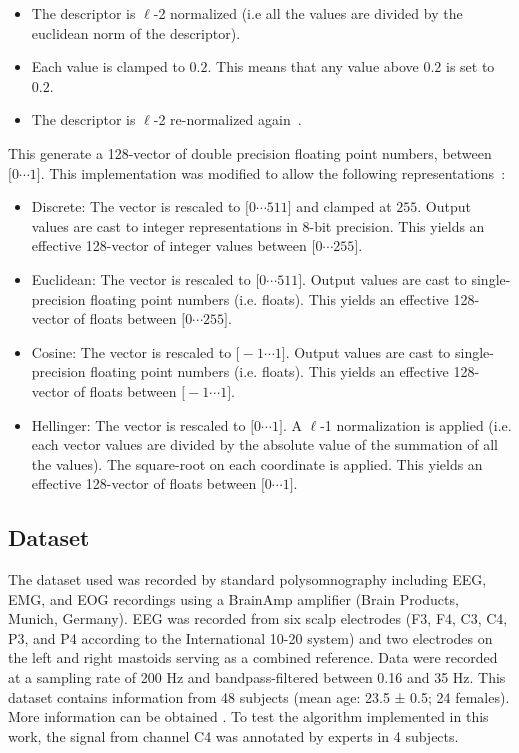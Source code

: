 \documentclass[review]{elsarticle}
\begin{document}
\begin{itemize}
\item The descriptor is $\ell$-2 normalized (i.e all the values are divided by the euclidean norm of the descriptor).
\item Each value is clamped to $0.2$.  This means that any value above $0.2$ is set to $0.2$.
\item The descriptor is $\ell$-2 re-normalized again~\cite{Rey-Otero2014}.
\end{itemize}

This generate a 128-vector of double precision floating point numbers, between $  \big[  0 \cdots 1 \big] $.  This implementation was modified to allow the following representations~\cite{Arandjelovic2012}:

\begin{itemize}
\item Discrete:  The vector is rescaled to $ \big[  0 \cdots 511 \big] $ and clamped at $255$.  Output values are cast to integer representations in 8-bit precision.  This yields an effective 128-vector of integer values between $ \big[  0 \cdots 255 \big] $.
\item Euclidean: The vector is rescaled to $ \big[  0 \cdots 511 \big]  $.  Output values are cast to single-precision floating point numbers (i.e. floats).  This yields an effective 128-vector of floats between $\big[  0 \cdots 255 \big] $.
\item Cosine: The vector is rescaled to $ \big[  -1  \cdots 1 \big] $.  Output values are cast to single-precision floating point numbers (i.e. floats).  This yields an effective 128-vector of floats between $\big[ -1 \cdots 1 \big] $.
\item Hellinger:  The vector is rescaled to $ \big[  0 \cdots 1 \big] $.  A $\ell$-1 normalization is applied (i.e. each vector values are divided by the absolute value of the summation of all the values).  The square-root on each coordinate is applied.  This yields an effective 128-vector of floats between $\big[  0 \cdots 1 \big] $.
\end{itemize}

\subsection{Dataset}
\label{dataset}

The dataset used was recorded by standard polysomnography including EEG, EMG, and EOG recordings using a BrainAmp amplifier (Brain Products, Munich, Germany).  EEG was recorded from six scalp electrodes (F3, F4, C3, C4, P3, and P4 according to the International 10-20 system) and two electrodes on the left and right mastoids serving as a combined reference. Data were recorded at a sampling rate of 200 Hz and bandpass-filtered between 0.16 and 35 Hz. This dataset contains information from 48 subjects (mean age: 23.5 ± 0.5; 24 females). More information can be obtained \citep{Forcato2020}. To test the algorithm implemented in this work, the signal from channel C4 was annotated by experts in 4 subjects.
\end{document}
